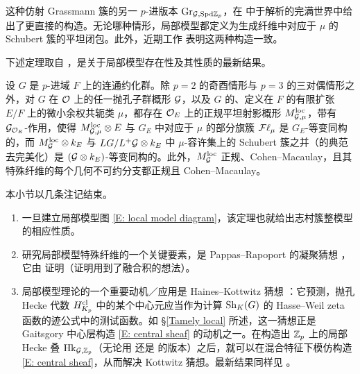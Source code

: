 这种仿射 Grassmann 簇的另一 $p$-进版本 ${\operatorname{Gr}}_{{\mathcal G},{\operatorname{Spd}}{\mathbb Z}_p}$，在 \cite{Scholze-Berkeley} 中于解析的完满世界中给出了更直接的构造。无论哪种情形，局部模型都定义为生成纤维中对应于 $\mu$ 的 Schubert 簇的平坦闭包。此外，近期工作 \cite{AGLR} 表明这两种构造一致。

下述定理取自 \cite{AGLR}，是关于局部模型存在性及其性质的最新结果。

\begin{thm}
设 $G$ 是 $p$-进域 $F$ 上的连通约化群。除 $p=2$ 的奇酉情形与 $p=3$ 的三对偶情形之外，对 $G$ 在 ${\mathcal O}$ 上的任一抛孔子群概形 ${\mathcal G}$，以及 $G$ 的、定义在 $F$ 的有限扩张 $E/F$ 上的微小余权共轭类 $\mu$，都存在 ${\mathcal O}_E$ 上的正规平坦射影概形 $M_{{\mathcal G},\mu}^{{\operatorname{loc}}}$，带有 ${\mathcal G}_{{\mathcal O}_E}$-作用，使得 $M_{{\mathcal G},\mu}^{{\operatorname{loc}}}\otimes E$ 与 $G_E$ 中对应于 $\mu$ 的部分旗簇 ${{\mathcal F}\ell}_{\mu}$ 是 $G_E$-等变同构的，而 $M_{{\mathcal G}}^{{\operatorname{loc}}}\otimes k_E$ 与 $LG/L^+{\mathcal G}\otimes k_E$ 中 $\mu$-容许集上的 Schubert 簇之并（的典范去完美化）是 $({\mathcal G}\otimes k_E)$-等变同构的。此外，$M_{{\mathcal G}}^{{\operatorname{loc}}}$ 正规、Cohen--Macaulay，且其特殊纤维的每个几何不可约分支都正规且 Cohen--Macaulay。
\end{thm}

本小节以几条注记结束。

\begin{rmk}
\begin{enumerate}
\item 一旦建立局部模型图 \eqref{E: local model diagram}，该定理也就给出志村簇整模型的相应性质。

\item 研究局部模型特殊纤维的一个关键要素，是 Pappas--Rapoport 的凝聚猜想 \cite{Pappas-Rapoport-Ramified-Unitary}，它由 \cite{Zhu-Coherence-Conjecture} 证明（证明用到了融合积的想法）。

\item 局部模型理论的一个重要动机／应用是 Haines--Kottwitz 猜想 \cite{Haines-Test-Function}：它预测，抛孔 Hecke 代数 $H_{K_p}^{{\operatorname{cl}}}$ 中的某个中心元应当作为计算 ${\operatorname{Sh}}_{K}(G)$ 的 Hasse--Weil zeta 函数的迹公式中的测试函数。如 \S\ref{Tamely local} 所述，这一猜想正是 Gaitsgory 中心层构造 \eqref{E: central sheaf} 的动机之一。在构造出 ${\mathbb Z}_p$ 上的局部 Hecke 叠 ${\operatorname{Hk}}_{{\mathcal G},{\mathbb Z}_p}$（无论用 \cite{Pappas-Zhu-Local-Model} 还是 \cite{Scholze-Berkeley} 的版本）之后，就可以在混合特征下模仿构造 \eqref{E: central sheaf}，从而解决 Kottwitz 猜想。最新结果同样见 \cite{AGLR}。
\end{enumerate}
\end{rmk}
